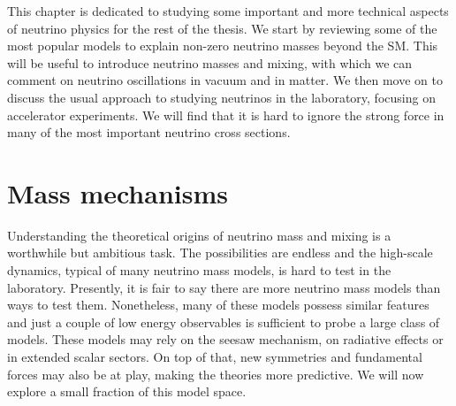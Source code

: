 \graphicspath{{}{theory/}{Diagrams/}}

This chapter is dedicated to studying some important and more technical aspects of neutrino physics for the rest of the thesis. We start by reviewing some of the most popular models to explain non-zero neutrino masses beyond the SM. This will be useful to introduce neutrino masses and mixing, with which we can comment on neutrino oscillations in vacuum and in matter. We then move on to discuss the usual approach to studying neutrinos in the laboratory, focusing on accelerator experiments. We will find that it is hard to ignore the strong force in many of the most important neutrino cross sections.

%
%

\section{Mass mechanisms}

Understanding the theoretical origins of neutrino mass and mixing is a worthwhile but ambitious task. The possibilities are endless and the high-scale dynamics, typical of many neutrino mass models, is hard to test in the laboratory. Presently, it is fair to say there are more neutrino mass models than ways to test them. Nonetheless, many of these models possess similar features and just a couple of low energy observables is sufficient to probe a large class of models. These models may rely on the seesaw mechanism, on radiative effects or in extended scalar sectors. On top of that, new symmetries and fundamental forces may also be at play, making the theories more predictive. We will now explore a small fraction of this model space.


